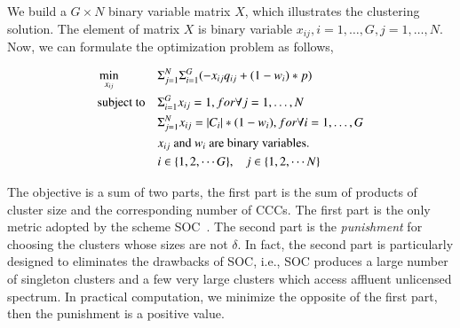 \documentclass[10pt,journal,compsoc]{IEEEtran}
\theoremstyle{mytheoremstyle}
\theoremstyle{mytheoremstyle}
\theoremstyle{mytheoremstyle}
\newcommand{\ie}{i.e., }
\begin{document}
We build a $G\times N$ binary variable matrix $X$, which illustrates the clustering solution.
The element of matrix $X$ is binary variable $x_{ij}, i=1, \ldots, G, j=1, \ldots, N$.
Now, we can formulate the optimization problem as follows,

\begin{equation}
\begin{aligned}
     &\min\limits_{x_{ij}} && \Sigma_{j=1}^N\Sigma_{i=1}^G (-x_{ij}q_{ij} + (1-w_i)*p) \\
     &\text{subject to}   && \Sigma_{i=1}^G x_{ij} = 1, for \forall j=1, \ldots, N \\
   &&& \Sigma_{j=1}^N x_{ij} = |C_i|*(1-w_i), for \forall i=1, \ldots, G \\
   &&& \text{$x_{ij}$ and $w_i$ are binary variables.}\\
   &&& i\in \{1,2, \cdots G\}, \hspace{0.3cm} j\in \{1,2,\cdots N\}
\notag
\end{aligned}
\end{equation}

The objective is a sum of two parts, the first part is the sum of products of cluster size and the corresponding number of CCCs.
The first part is the only metric adopted by the scheme SOC~\cite{Lazos09}.
The second part is the \textit{punishment} for choosing the clusters whose sizes are not $\delta$.
In fact, the second part is particularly designed to eliminates the drawbacks of SOC, \ie SOC produces a large number of singleton clusters and a few very large clusters which access affluent unlicensed spectrum.
In practical computation, we minimize the opposite of the first part, then the punishment is a positive value.
\end{document}
